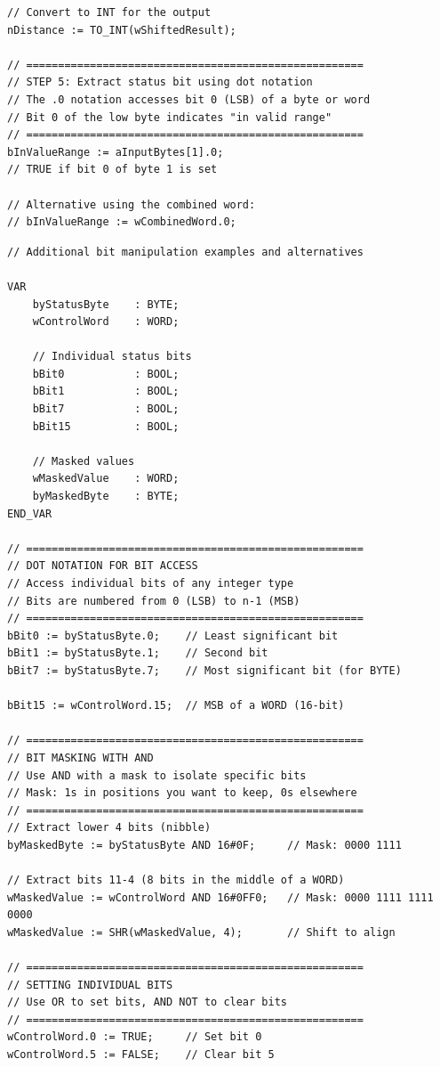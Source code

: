 \documentclass[11pt,a4paper]{article}
\begin{document}
\begin{lstlisting}
// Convert to INT for the output
nDistance := TO_INT(wShiftedResult);

// =====================================================
// STEP 5: Extract status bit using dot notation
// The .0 notation accesses bit 0 (LSB) of a byte or word
// Bit 0 of the low byte indicates "in valid range"
// =====================================================
bInValueRange := aInputBytes[1].0;
// TRUE if bit 0 of byte 1 is set

// Alternative using the combined word:
// bInValueRange := wCombinedWord.0;
\end{lstlisting}

\begin{lstlisting}
// Additional bit manipulation examples and alternatives

VAR
    byStatusByte    : BYTE;
    wControlWord    : WORD;
    
    // Individual status bits
    bBit0           : BOOL;
    bBit1           : BOOL;
    bBit7           : BOOL;
    bBit15          : BOOL;
    
    // Masked values
    wMaskedValue    : WORD;
    byMaskedByte    : BYTE;
END_VAR

// =====================================================
// DOT NOTATION FOR BIT ACCESS
// Access individual bits of any integer type
// Bits are numbered from 0 (LSB) to n-1 (MSB)
// =====================================================
bBit0 := byStatusByte.0;    // Least significant bit
bBit1 := byStatusByte.1;    // Second bit
bBit7 := byStatusByte.7;    // Most significant bit (for BYTE)

bBit15 := wControlWord.15;  // MSB of a WORD (16-bit)

// =====================================================
// BIT MASKING WITH AND
// Use AND with a mask to isolate specific bits
// Mask: 1s in positions you want to keep, 0s elsewhere
// =====================================================
// Extract lower 4 bits (nibble)
byMaskedByte := byStatusByte AND 16#0F;     // Mask: 0000 1111

// Extract bits 11-4 (8 bits in the middle of a WORD)
wMaskedValue := wControlWord AND 16#0FF0;   // Mask: 0000 1111 1111 0000
wMaskedValue := SHR(wMaskedValue, 4);       // Shift to align

// =====================================================
// SETTING INDIVIDUAL BITS
// Use OR to set bits, AND NOT to clear bits
// =====================================================
wControlWord.0 := TRUE;     // Set bit 0
wControlWord.5 := FALSE;    // Clear bit 5


\end{lstlisting}
\end{document}
